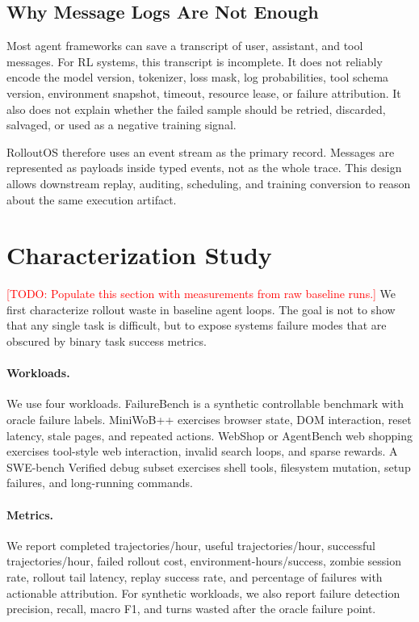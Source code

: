 \documentclass{article}
\newcommand{\sys}{RolloutOS}
\newcommand{\todo}[1]{\textcolor{red}{[TODO: #1]}}
\begin{document}
\subsection{Why Message Logs Are Not Enough}

Most agent frameworks can save a transcript of user, assistant, and tool messages.
For RL systems, this transcript is incomplete.
It does not reliably encode the model version, tokenizer, loss mask, log probabilities, tool schema version, environment snapshot, timeout, resource lease, or failure attribution.
It also does not explain whether the failed sample should be retried, discarded, salvaged, or used as a negative training signal.

\sys{} therefore uses an event stream as the primary record.
Messages are represented as payloads inside typed events, not as the whole trace.
This design allows downstream replay, auditing, scheduling, and training conversion to reason about the same execution artifact.

\section{Characterization Study}
\label{sec:characterization}

\todo{Populate this section with measurements from raw baseline runs.}
We first characterize rollout waste in baseline agent loops.
The goal is not to show that any single task is difficult, but to expose systems failure modes that are obscured by binary task success metrics.

\paragraph{Workloads.}
We use four workloads.
FailureBench is a synthetic controllable benchmark with oracle failure labels.
MiniWoB++ exercises browser state, DOM interaction, reset latency, stale pages, and repeated actions.
WebShop or AgentBench web shopping exercises tool-style web interaction, invalid search loops, and sparse rewards.
A SWE-bench Verified debug subset exercises shell tools, filesystem mutation, setup failures, and long-running commands.

\paragraph{Metrics.}
We report completed trajectories/hour, useful trajectories/hour, successful trajectories/hour, failed rollout cost, environment-hours/success, zombie session rate, rollout tail latency, replay success rate, and percentage of failures with actionable attribution.
For synthetic workloads, we also report failure detection precision, recall, macro F1, and turns wasted after the oracle failure point.
\end{document}
